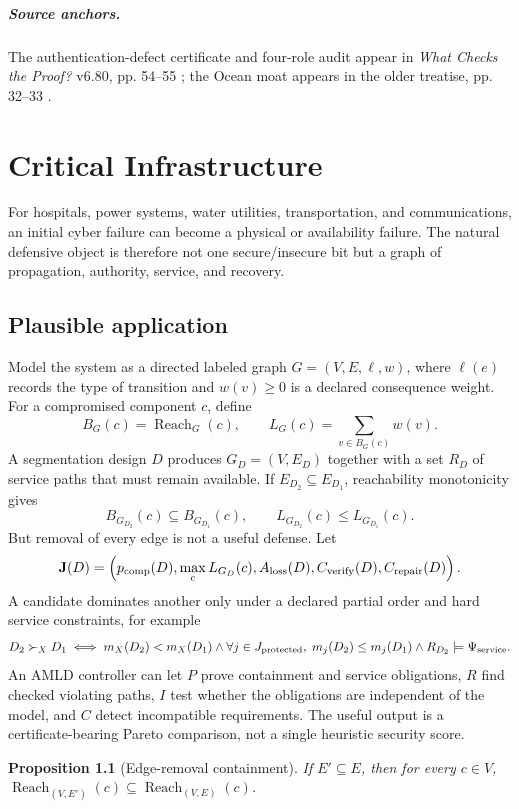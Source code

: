 \documentclass[11pt,oneside]{book}
\newtheorem{proposition}[theorem]{Proposition}
\theoremstyle{definition}
\theoremstyle{remark}
\newcommand{\Reach}{\operatorname{Reach}}
\begin{document}
\paragraph{Source anchors.} The authentication-defect certificate and four-role audit appear in
\emph{What Checks the Proof?} v6.80, pp. 54--55 \cite{TennesonChecks}; the Ocean moat appears in
the older treatise, pp. 32--33 \cite{TennesonSecurity}.

\chapter{Critical Infrastructure}
\label{ch:infrastructure}

For hospitals, power systems, water utilities, transportation, and communications, an initial cyber
failure can become a physical or availability failure. The natural defensive object is therefore not
one secure/insecure bit but a graph of propagation, authority, service, and recovery.

\section{Plausible application}
Model the system as a directed labeled graph \(G=(V,E,\ell,w)\), where \(\ell(e)\) records the type
of transition and \(w(v)\ge0\) is a declared consequence weight. For a compromised component
\(c\), define
\[
B_G(c)=\Reach_G(c),
\qquad
L_G(c)=\sum_{v\in B_G(c)}w(v).
\]
A segmentation design \(D\) produces \(G_D=(V,E_D)\) together with a set \(R_D\) of service
paths that must remain available. If \(E_{D_2}\subseteq E_{D_1}\), reachability monotonicity gives
\[
B_{G_{D_2}}(c)\subseteq B_{G_{D_1}}(c),
\qquad
L_{G_{D_2}}(c)\le L_{G_{D_1}}(c).
\]
But removal of every edge is not a useful defense. Let
\[
\mathbf J(D)=\left(
p_{\rm comp}(D),
\max_cL_{G_D}(c),
A_{\rm loss}(D),
C_{\rm verify}(D),
C_{\rm repair}(D)
\right).
\]
A candidate dominates another only under a declared partial order and hard service constraints,
for example
\[
D_2\succ_XD_1
\iff
m_X(D_2)<m_X(D_1)
\land
\forall j\in J_{\rm protected},\;m_j(D_2)\le m_j(D_1)
\land R_{D_2}\models\Psi_{\rm service}.
\]
An AMLD controller can let \(P\) prove containment and service obligations, \(R\) find checked
violating paths, \(I\) test whether the obligations are independent of the model, and \(C\) detect
incompatible requirements. The useful output is a certificate-bearing Pareto comparison, not a
single heuristic security score.

\begin{proposition}[Edge-removal containment]
If \(E'\subseteq E\), then for every \(c\in V\), \(\Reach_{(V,E')}(c)\subseteq\Reach_{(V,E)}(c)\).
\end{proposition}
\end{document}
